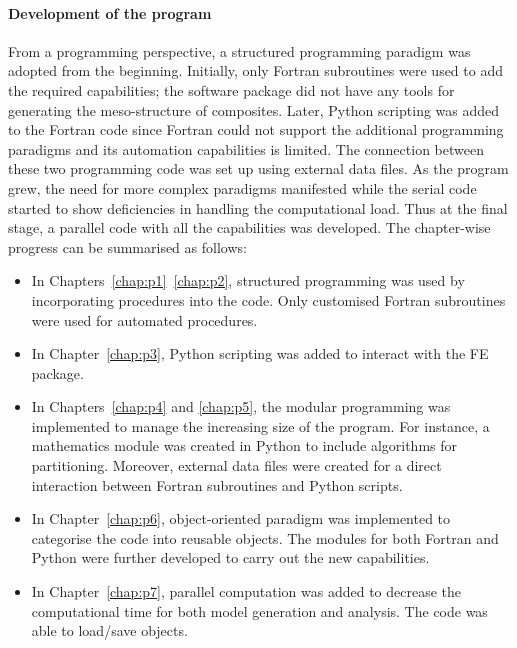 	\paragraph{Development of the program}
		From a programming perspective, a structured programming paradigm was adopted from the beginning. Initially, only Fortran subroutines were used to add the required capabilities; the software package did not have any tools for generating the meso-structure of composites. Later, Python scripting was added to the Fortran code since Fortran could not support the additional programming paradigms and its automation capabilities is limited. The connection between these two programming code was set up using external data files. As the program grew, the need for more complex paradigms manifested while the serial code started to show deficiencies in handling the computational load. Thus at the final stage, a parallel code with all the capabilities was developed. The chapter-wise progress can be summarised as follows:
	\begin{itemize}
		\item In Chapters~\ref{chap:p1}~\ref{chap:p2}, structured programming was used by incorporating procedures into the code. Only customised Fortran subroutines were used for automated procedures.
		\item In Chapter~\ref{chap:p3}, Python scripting was added to interact with the FE package.
		\item In Chapters~\ref{chap:p4} and \ref{chap:p5}, the modular programming was implemented to manage the increasing size of the program. For instance, a mathematics module was created in Python to include algorithms for partitioning. Moreover, external data files were created for a direct interaction between Fortran subroutines and Python scripts.
		\item In Chapter~\ref{chap:p6}, object-oriented paradigm was implemented to categorise the code into reusable objects. The modules for both Fortran and Python were further developed to carry out the new capabilities.
		\item In Chapter~\ref{chap:p7}, parallel computation was added to decrease the computational time for both model generation and analysis. The code was able to load/save objects.
	\end{itemize}		

